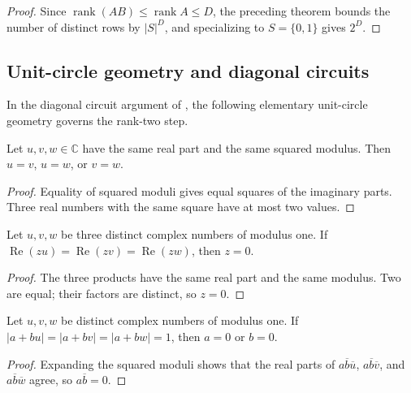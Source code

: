 \begin{proof}\leanok
    Since $\operatorname{rank}(AB)\leq\operatorname{rank}A\leq D$, the
    preceding theorem bounds the number of distinct rows by $|S|^D$, and
    specializing to $S=\{0,1\}$ gives $2^D$.
\end{proof}

\subsection{Unit-circle geometry and diagonal circuits}

In the diagonal circuit argument of \cite{DiagonalMPUCircuits2026}, the
following elementary unit-circle geometry governs the rank-two step.

\begin{lemma}
    \label{thm:mpu_circle_vertical}
    \leanok
    Let $u,v,w\in\mathbb C$ have the same real part and the same squared
    modulus. Then $u=v$, $u=w$, or $v=w$.
\end{lemma}
\begin{proof}\leanok
    Equality of squared moduli gives equal squares of the imaginary parts.
    Three real numbers with the same square have at most two values.
\end{proof}

\begin{lemma}
    \label{thm:mpu_circle_functional}
    \leanok
    Let $u,v,w$ be three distinct complex numbers of modulus one. If
    $\operatorname{Re}(zu)=\operatorname{Re}(zv)=\operatorname{Re}(zw)$,
    then $z=0$.
\end{lemma}
\begin{proof}\leanok
    The three products have the same real part and the same modulus.
    Two are equal; their factors are distinct, so $z=0$.
\end{proof}

\begin{lemma}
    \label{thm:mpu_circle_affine}
    \leanok
    Let $u,v,w$ be distinct complex numbers of modulus one. If
    $|a+bu|=|a+bv|=|a+bw|=1$, then $a=0$ or $b=0$.
\end{lemma}
\begin{proof}\leanok
    Expanding the squared moduli shows that the real parts of
    $a\overline b\overline u$, $a\overline b\overline v$, and
    $a\overline b\overline w$ agree, so $a\overline b=0$.
\end{proof}

